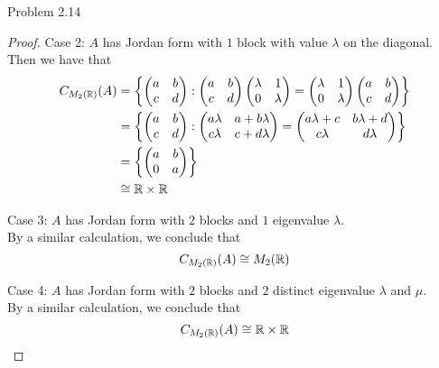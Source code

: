 \documentclass[a4paper]{article}
\begin{document}
\begin{ex}{Problem 2.14}{}
\begin{proof}
Case 2: $A$ has Jordan form with $1$ block with value $\lambda$ on the diagonal. \\
Then we have that
\begin{align*}
C_{M_2(\mathbb{R})}(A)&=\left\{ \begin{pmatrix}a&b\\c&d\end{pmatrix}:\begin{pmatrix}a&b\\c&d\end{pmatrix}\begin{pmatrix}\lambda & 1 \\ 0 & \lambda\end{pmatrix}=\begin{pmatrix}\lambda & 1 \\ 0 & \lambda\end{pmatrix}\begin{pmatrix}a&b\\c&d\end{pmatrix} \right\}\\
&=\left\{ \begin{pmatrix}a&b\\c&d\end{pmatrix}: \begin{pmatrix}
    a\lambda & a+b\lambda \\ c\lambda & c+d\lambda
\end{pmatrix}=\begin{pmatrix}
    a\lambda+c & b\lambda+d \\ c\lambda & d\lambda
\end{pmatrix} \right\} \\
&=\left\{ \begin{pmatrix}a & b \\ 0 & a\end{pmatrix} \right\}\\
&\cong \mathbb{R}\times\mathbb{R}
\end{align*}

Case 3: $A$ has Jordan form with $2$ blocks and $1$ eigenvalue $\lambda$. \\
By a similar calculation, we conclude that $$C_{M_2(\mathbb{R})}(A)\cong M_2(\mathbb{R})$$

Case 4: $A$ has Jordan form with $2$ blocks and $2$ distinct eigenvalue $\lambda$ and $\mu$. \\
By a similar calculation, we conclude that $$C_{M_2(\mathbb{R})}(A)\cong\mathbb{R}\times\mathbb{R}$$

\end{proof}
\end{ex}
\end{document}
